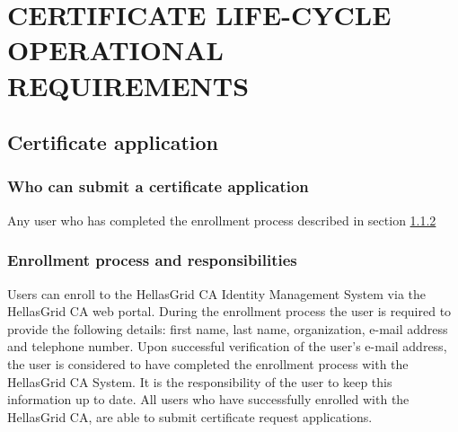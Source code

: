 
\chapter{CERTIFICATE LIFE-CYCLE OPERATIONAL REQUIREMENTS}
\section{Certificate application}
\subsection{Who can submit a certificate application}
\label{sub:WhoCanSubmitACertificateApplication}

Any user who has completed the enrollment process described in section \ref{sub:EnrollmentProcessAndResponsibilities}

\subsection{Enrollment process and responsibilities}
\label{sub:EnrollmentProcessAndResponsibilities}

Users can enroll to the HellasGrid CA Identity Management System via the HellasGrid CA web portal. During the enrollment process the user is required to provide the following details: first name, last name, organization, e-mail address and telephone number. Upon successful verification of the user's e-mail address, the user is considered to have completed the enrollment process with the HellasGrid CA  System. It is the responsibility of the user to keep this information up to date. All users who have successfully enrolled with the HellasGrid CA, are able to submit certificate request applications.


